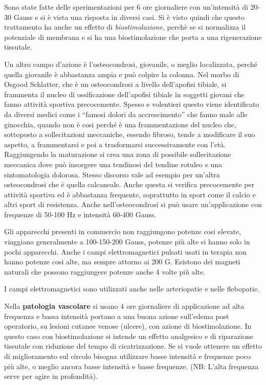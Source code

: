 Sono state fatte delle sperimentazioni per 6 ore giornaliere con
un'intensità di 20-30 Gauss e si è vista una risposta in diversi casi.
Si è visto quindi che questo trattamento ha anche un effetto di
\emph{biostimolazione}, perchè se si normalizza il potenziale di
membrana e si ha una biostimolazione che porta a una rigenerazione
tissutale.

Un altro campo d'azione è l'osteocondrosi, giovanile, o meglio
localizzata, perché quella giovanile è abbastanza ampia e può colpire la
colonna. Nel morbo di Osgood Schlatter, che è un osteocondrosi a livello
dell'apofisi tibiale, si frammenta il nucleo di ossificazione
dell'apofisi tibiale in soggetti giovani che fanno attività sportiva
precocemente. Spesso e volentieri questo viene identificato da diversi
medici come i ``famosi dolori da accrescimento'' che fanno male alle
ginocchia, quando non è cosi perché è una frammentazione del nucleo che,
sottoposto a sollecitazioni meccaniche, essendo fibroso, tende a
modificare il suo aspetto, a frammentarsi e poi a trasformarsi
successivamente con l'età. Raggiungendo la maturazione si crea una zona
di possibile sollecitazione meccanica dove può insorgere una tendinosi
del tendine rotuleo e una sintomatologia dolorosa. Stesso discorso vale
ad esempio per un'altra osteocondrosi che è quella calcaneale. Anche
questa si verifica precocemente per attività sportiva ed è abbastanza
frequente, soprattutto in sport come il calcio e altri sport di
resistenza. Anche nell'osteocondrosi si può usare un'applicazione con
frequenze di 50-100 Hz e intensità 60-400 Gauss.

Gli apparecchi presenti in commercio non raggiungono potenze cosi
elevate, viaggiano generalmente a 100-150-200 Gauss, potenze più alte si
hanno solo in pochi apparecchi. Anche i campi elettromagnetici pulsati
usati in terapia non hanno potenze cosi alte, ma sempre attorno ai 200
G. Esistono dei magneti naturali che possono raggiungere potenze anche 4
volte più alte.

I campi elettromagnetici sono utilizzati anche nelle arteriopatie e
nelle flebopatie.

Nella \textbf{patologia vascolare} si usano 4 ore giornaliere di
applicazione ad alta frequenza e bassa intensità portano a una buona
azione sull'edema post operatorio, su lesioni cutanee venose (ulcere),
con azione di biostimolazione. In questo caso con biostimolazione si
intende un effetto analgesico e di riparazione tissutale con riduzione
del tempo di cicatrizzazione. Se si vuole ottenere un effetto di
miglioramento sul circolo bisogna utilizzare basse intensità e frequenze
poco più alte, o meglio ancora basse intensità e basse frequenze. (NB:
L'alta frequenza serve per agire in profondità).

